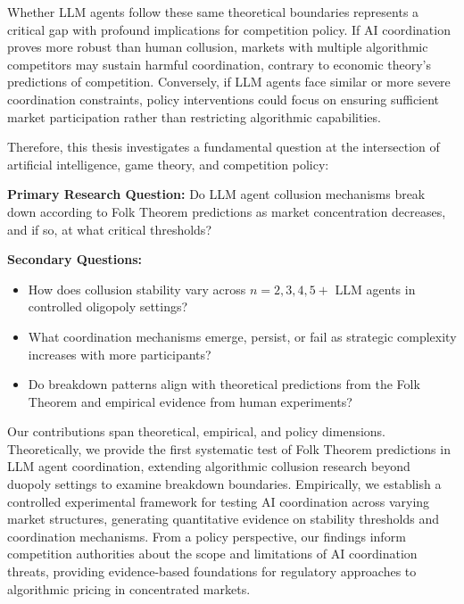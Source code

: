 Whether LLM agents follow these same theoretical boundaries represents a critical gap with profound implications for competition policy. If AI coordination proves more robust than human collusion, markets with multiple algorithmic competitors may sustain harmful coordination, contrary to economic theory's predictions of competition. Conversely, if LLM agents face similar or more severe coordination constraints, policy interventions could focus on ensuring sufficient market participation rather than restricting algorithmic capabilities.


Therefore, this thesis investigates a fundamental question at the intersection of artificial intelligence, game theory, and competition policy:

\textbf{Primary Research Question:} Do LLM agent collusion mechanisms break down according to Folk Theorem predictions as market concentration decreases, and if so, at what critical thresholds?

\textbf{Secondary Questions:}
\begin{itemize}
    \item How does collusion stability vary across $n = 2, 3, 4, 5+$ LLM agents in controlled oligopoly settings?
    \item What coordination mechanisms emerge, persist, or fail as strategic complexity increases with more participants?
    \item Do breakdown patterns align with theoretical predictions from the Folk Theorem and empirical evidence from human experiments?
\end{itemize}

Our contributions span theoretical, empirical, and policy dimensions. Theoretically, we provide the first systematic test of Folk Theorem predictions in LLM agent coordination, extending algorithmic collusion research beyond duopoly settings to examine breakdown boundaries. Empirically, we establish a controlled experimental framework for testing AI coordination across varying market structures, generating quantitative evidence on stability thresholds and coordination mechanisms. From a policy perspective, our findings inform competition authorities about the scope and limitations of AI coordination threats, providing evidence-based foundations for regulatory approaches to algorithmic pricing in concentrated markets.

